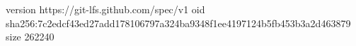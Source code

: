 version https://git-lfs.github.com/spec/v1
oid sha256:7c2edcf43ed27add178106797a324ba9348f1ee4197124b5fb453b3a2d463879
size 262240
